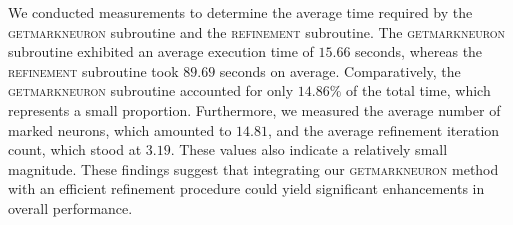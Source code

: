 We conducted measurements to determine the average time required by the \textsc{getmarkneuron} subroutine 
and the \textsc{refinement} subroutine. 
The \textsc{getmarkneuron} subroutine exhibited an average execution time of $15.66$ seconds, 
whereas the \textsc{refinement} subroutine took $89.69$ seconds on average. 
Comparatively, the \textsc{getmarkneuron} subroutine accounted for only $14.86\%$ of the total time, 
which represents a small proportion. Furthermore, we measured the average number of marked neurons, 
which amounted to $14.81$, and the average refinement iteration count, which stood at $3.19$. 
These values also indicate a relatively small magnitude. 
These findings suggest that integrating our \textsc{getmarkneuron} method with an efficient refinement 
procedure could yield significant enhancements in overall performance.



